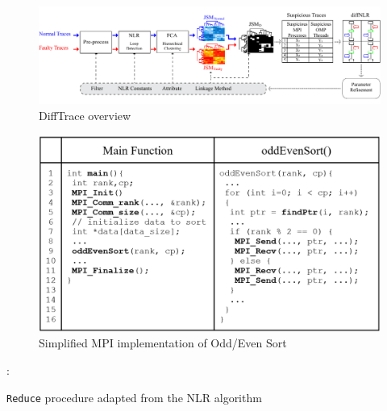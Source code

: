 
\begin{figure}[]
\includegraphics[width=1\textwidth]{diffTrace/figs/overview4.pdf}
\caption{DiffTrace overview}
\label{fig.diffTraceOverview}
\end{figure}


\begin{figure}[]
\centering
\includegraphics[width=.8\textwidth]{diffTrace/figs/oddEven.png}
\caption{Simplified MPI implementation of Odd/Even Sort}
\label{fig.oddEven}
\end{figure}








\begin{small}
\begin{algorithm}[]
 \DontPrintSemicolon
 :{\\
 \Indp
 }

 \caption{\texttt{Reduce} procedure adapted from the NLR algorithm }
 \label{proc:NLR}
\end{algorithm}
\end{small}


